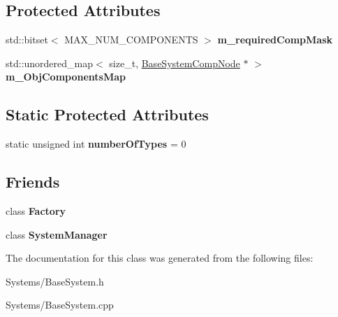 \subsection*{Protected Attributes}
\begin{DoxyCompactItemize}
\item 
\mbox{\label{classBaseSystem_ab0f0418b57f4f6fdfb12fa6f317c1921}} 
std\+::bitset$<$ M\+A\+X\+\_\+\+N\+U\+M\+\_\+\+C\+O\+M\+P\+O\+N\+E\+N\+TS $>$ {\bfseries m\+\_\+required\+Comp\+Mask}
\item 
\mbox{\label{classBaseSystem_a24b890d25ee0eeed44ef6976c7188224}} 
std\+::unordered\+\_\+map$<$ size\+\_\+t, \hyperlink{structBaseSystemCompNode}{Base\+System\+Comp\+Node} $\ast$ $>$ {\bfseries m\+\_\+\+Obj\+Components\+Map}
\end{DoxyCompactItemize}
\subsection*{Static Protected Attributes}
\begin{DoxyCompactItemize}
\item 
\mbox{\label{classBaseSystem_a7ef356edab3cfb02905e0a73a645b131}} 
static unsigned int {\bfseries number\+Of\+Types} = 0
\end{DoxyCompactItemize}
\subsection*{Friends}
\begin{DoxyCompactItemize}
\item 
\mbox{\label{classBaseSystem_a328c093d609680cca505905c6d49901a}} 
class {\bfseries Factory}
\item 
\mbox{\label{classBaseSystem_ab1ef2aa9992dd8ae85793e1a1f980e1e}} 
class {\bfseries System\+Manager}
\end{DoxyCompactItemize}


The documentation for this class was generated from the following files\+:\begin{DoxyCompactItemize}
\item 
Systems/Base\+System.\+h\item 
Systems/Base\+System.\+cpp\end{DoxyCompactItemize}
